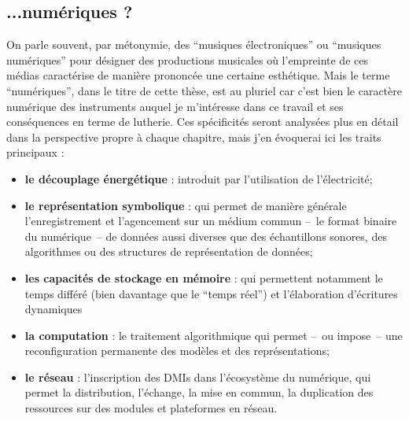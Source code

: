 \subsection{...numériques ?}

\indent On parle souvent, par métonymie, des ``musiques électroniques'' ou ``musiques numériques'' pour désigner des productions musicales où l'empreinte de ces médias caractérise de manière prononcée une certaine esthétique. Mais le terme ``numériques'', dans le titre de cette thèse, est au pluriel car c'est bien le caractère numérique des instruments auquel je m'intéresse dans ce travail et ses conséquences en terme de lutherie. Ces spécificités seront analysées plus en détail dans la perspective propre à chaque chapitre, mais j'en évoquerai ici les traits principaux :
\vspace{-1em}
\begin{itemize}[noitemsep]
\item \textbf{le découplage énergétique} : introduit par l'utilisation de l'électricité;
\item \textbf{le représentation symbolique} : qui permet de manière générale l'enregistrement et l'agencement sur un médium commun --~le format binaire du numérique~-- de données aussi diverses que des échantillons sonores, des algorithmes ou des structures de représentation de données;
\item \textbf{les capacités de stockage en mémoire} : qui permettent notamment le temps différé (bien davantage que le ``temps réel'') et l'élaboration d'écritures dynamiques 
\item \textbf{la computation} : le traitement algorithmique qui permet --~ou impose~-- une reconfiguration permanente des modèles et des représentations;
\item \textbf{le réseau} : l'inscription des \glspl{DMI} dans l'écosystème du numérique, qui permet la distribution, l'échange, la mise en commun, la duplication des ressources sur des modules et plateformes en réseau.
\end{itemize}

